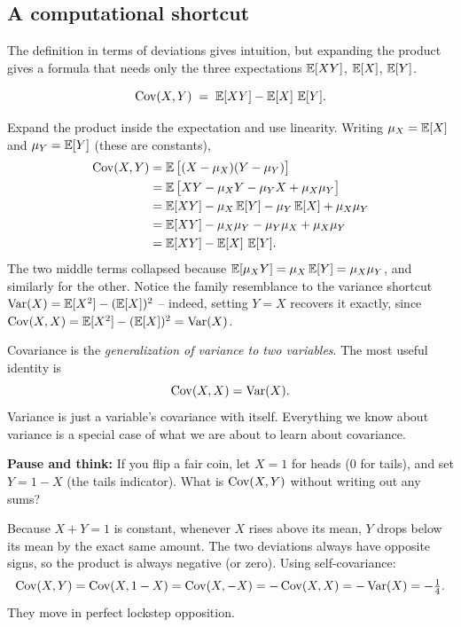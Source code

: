 \subsection{A computational shortcut}

The definition in terms of deviations gives intuition, but expanding the product gives a formula
that needs only the three expectations $\operatorname{\mathbb{E}}[XY]$, $\operatorname{\mathbb{E}}[X]$, $\operatorname{\mathbb{E}}[Y]$.

\begin{proposition}
\label{ch14:cov-shortcut}
\[
\operatorname{Cov}(X, Y) \;=\; \operatorname{\mathbb{E}}[XY] - \operatorname{\mathbb{E}}[X]\,\operatorname{\mathbb{E}}[Y].
\]
\end{proposition}

\begin{whybox}
Expand the product inside the expectation and use linearity. Writing
$\mu_X = \operatorname{\mathbb{E}}[X]$ and $\mu_Y = \operatorname{\mathbb{E}}[Y]$ (these are constants),
\begin{align*}
\operatorname{Cov}(X,Y)
&= \operatorname{\mathbb{E}}\big[(X-\mu_X)(Y-\mu_Y)\big] \\
&= \operatorname{\mathbb{E}}\big[XY - \mu_X Y - \mu_Y X + \mu_X \mu_Y\big] \\
&= \operatorname{\mathbb{E}}[XY] - \mu_X \operatorname{\mathbb{E}}[Y] - \mu_Y \operatorname{\mathbb{E}}[X] + \mu_X \mu_Y \\
&= \operatorname{\mathbb{E}}[XY] - \mu_X \mu_Y - \mu_Y \mu_X + \mu_X \mu_Y \\
&= \operatorname{\mathbb{E}}[XY] - \operatorname{\mathbb{E}}[X]\,\operatorname{\mathbb{E}}[Y].
\end{align*}
The two middle terms collapsed because $\operatorname{\mathbb{E}}[\mu_X Y] = \mu_X \operatorname{\mathbb{E}}[Y] = \mu_X \mu_Y$,
and similarly for the other. Notice the family resemblance to the variance
shortcut $\operatorname{Var}(X) = \operatorname{\mathbb{E}}[X^2] - (\operatorname{\mathbb{E}}[X])^2$ -- indeed, setting $Y = X$ recovers it
exactly, since $\operatorname{Cov}(X, X) = \operatorname{\mathbb{E}}[X^2] - (\operatorname{\mathbb{E}}[X])^2 = \operatorname{Var}(X)$.
\end{whybox}

\begin{focusbox}
Covariance is the \emph{generalization of variance to two variables}. The most useful identity is
\[
\operatorname{Cov}(X, X) = \operatorname{Var}(X).
\]
Variance is just a variable's covariance with itself. Everything we know about
variance is a special case of what we are about to learn about covariance.
\end{focusbox}

\begin{recoverybox}
\textbf{Pause and think:} If you flip a fair coin, let $X = 1$ for heads ($0$ for tails), and set $Y = 1 - X$ (the tails indicator). What is $\operatorname{Cov}(X, Y)$ without writing out any sums?

Because $X + Y = 1$ is constant, whenever $X$ rises above its mean, $Y$ drops below its mean by the exact same amount. The two deviations always have opposite signs, so the product is always negative (or zero). Using self-covariance:
\[
\operatorname{Cov}(X, Y) = \operatorname{Cov}(X, 1 - X) = \operatorname{Cov}(X, -X) = -\operatorname{Cov}(X, X) = -\operatorname{Var}(X) = -\tfrac{1}{4}.
\]
They move in perfect lockstep opposition.
\end{recoverybox}

